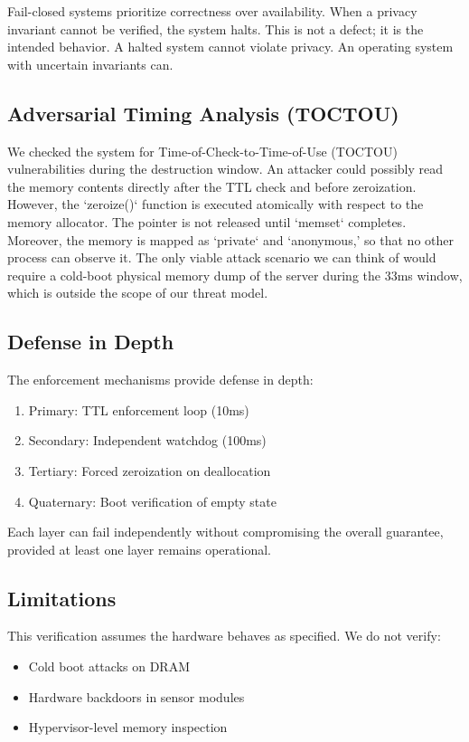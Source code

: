 \documentclass[conference]{IEEEtran}
\begin{document}
Fail-closed systems prioritize correctness over availability. When a privacy invariant cannot be verified, the system halts. This is not a defect; it is the intended behavior. A halted system cannot violate privacy. An operating system with uncertain invariants can.

\subsection{Adversarial Timing Analysis (TOCTOU)}
We checked the system for Time-of-Check-to-Time-of-Use (TOCTOU) vulnerabilities during the destruction window. An attacker could possibly read the memory contents directly after the TTL check and before zeroization. However, the `zeroize()` function is executed atomically with respect to the memory allocator. The pointer is not released until `memset` completes. Moreover, the memory is mapped as `private` and `anonymous,' so that no other process can observe it. The only viable attack scenario we can think of would require a cold-boot physical memory dump of the server during the 33ms window, which is outside the scope of our threat model.

\subsection{Defense in Depth}
The enforcement mechanisms provide defense in depth:
\begin{enumerate}
    \item Primary: TTL enforcement loop (10ms)
    \item Secondary: Independent watchdog (100ms)
    \item Tertiary: Forced zeroization on deallocation
    \item Quaternary: Boot verification of empty state
\end{enumerate}

Each layer can fail independently without compromising the overall guarantee, provided at least one layer remains operational.

\subsection{Limitations}
This verification assumes the hardware behaves as specified. We do not verify:
\begin{itemize}
    \item Cold boot attacks on DRAM
    \item Hardware backdoors in sensor modules
    \item Hypervisor-level memory inspection
\end{itemize}
\end{document}
